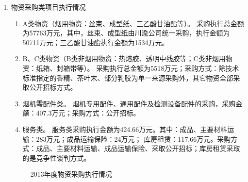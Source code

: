 \begin{enumerate}
  \item 物资采购类项目执行情况
   \begin{enumerate}[1、]
 \item A类物资（烟用物资：丝束、成型纸、三乙酸甘油酯等）。
采购执行总金额为57763万元，其中，丝束、成型纸由川渝公司统一采购，执行金额为50711万元；三乙酸甘油酯执行金额为1534万元。

 \item B、C类物资（B类非烟用物资：热熔胶、透明中线胶等；C类非烟用物资：纸箱、封箱带等）。
采购执行总金额为5518万元；采购方式：除技术标准指定的香精、茶叶末、部分乳胶为单一来源采购外，其它物资全部采取公开招标方式。

 \item 烟机零配件类。
烟机专用配件、通用配件及检测设备配件的采购，采购金额：407.3万元；采购方式：公开招标。

 \item 服务类。
服务类采购执行金额为424.66万元。其中：成品、主要材料运输：283万元；成品运输保险：24万元； 库房租赁：117.66万元。采购方式：成品、主要材料运输、成品运输保险、采取公开招标；库房租赁采取的是竞争性谈判方式。
 \end{enumerate}


\begin{figure}[htpb]
\begin{minipage}{0.05\textwidth}
 \end{minipage}
\hfill
\begin{minipage}{0.85\textwidth}
\begin{flushleft}
\end{flushleft}
%
\vskip 3cm
%
 \begin{flushleft}
\end{flushleft}
 \end{minipage}
\vskip 6cm
\caption{2013年度物资采购执行情况}
\end{figure}




\end{enumerate}
